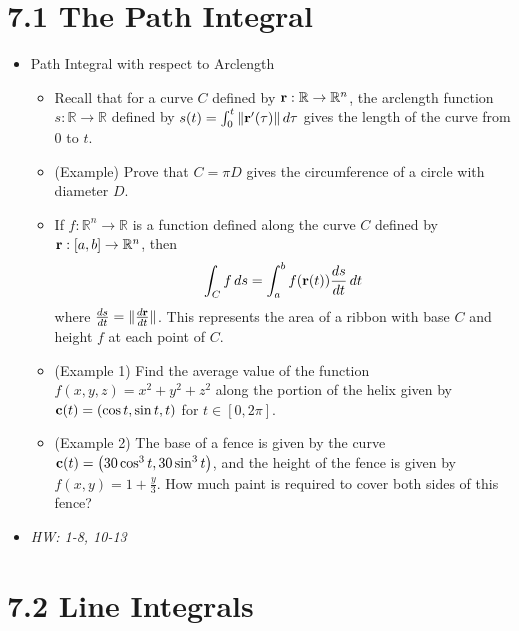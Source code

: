 \documentclass[11pt]{article}
\begin{document}
\section*{7.1 The Path Integral}

\begin{itemize}
  \item Path Integral with respect to Arclength
    \begin{itemize}
      \item Recall that for a curve \(C\) defined by
            \(\mathbf{r}:\mathbb R\to\mathbb R^n\), the arclength function
            \(s:\mathbb R\to\mathbb R\) defined by
            \(s(t)=\int_0^t\|\mathbf{r}'(\tau)\|\,d\tau\) gives the length
            of the curve from \(0\) to \(t\).
      \item (Example) Prove that \(C=\pi D\) gives the circumference of
            a circle with diameter \(D\).
      \item If \(f:\mathbb R^n\to\mathbb R\) is a function defined
            along the curve \(C\) defined by \(\mathbf{r}:[a,b]\to\mathbb R^n\),
            then
            \[
              \int_C f\,d s
                =
              \int_a^b f(\mathbf{r}(t))\frac{ds}{dt}\,d t
            \]
            where \(\frac{ds}{dt}=\|\frac{d\mathbf{r}}{dt}\|\).
            This represents the area of a ribbon with base \(C\) and
            height \(f\) at each point of \(C\).
      \item (Example 1) Find the average value of the function
            \(f(x,y,z)=x^2+y^2+z^2\) along the portion of the helix given by
            \(\mathbf{c}(t)=\left(\cos t,\sin t,t\right)\) for \(t\in[0,2\pi]\).
      \item (Example 2) The base of a fence is given by the curve
            \(\mathbf{c}(t)=\left(30\cos^3t,30\sin^3t\right)\), and the height of the
            fence is given by \(f(x,y)=1+\frac{y}{3}\). How much paint is
            required to cover both sides of this fence?
    \end{itemize}
  \item\textit{
    HW: 1-8, 10-13
  }
\end{itemize}



\section*{7.2 Line Integrals}
\end{document}
